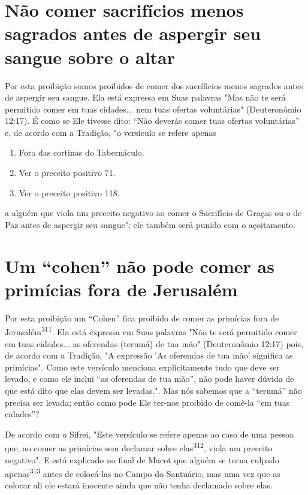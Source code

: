 \section{Não comer sacrifícios menos sagrados antes de aspergir seu sangue sobre o altar}

Por esta proibição somos proibidos de comer dos sacríficios menos
sagrados antes de aspergir seu sangue. Ela está expressa em Suas
palavras "Mas não te será permitido comer em tuas cidades... nem tuas
ofertas voluntárias" (Deuteronômio 12:17). É como se Ele tivesse dito:
``Não deverás comer tuas ofertas voluntárias'' e, de acordo com a
Tradição, "o versículo se refere apenas


\begin{enumerate}
\def\labelenumi{\arabic{enumi}.}
\setcounter{enumi}{306}
\item
 
 Fora das cortinas do Tabernáculo.
 
\item
 
 Ver o preceito positivo 71.
 
\item
 
 Ver o preceito positivo 118.
 
\end{enumerate}

a alguém que viola um preceito negativo ao comer o Sacrifício de Graças
ou o de Paz antes de aspergir seu sangue"; ele também será punido com o
açoitamento.

\section{Um ``cohen'' não pode comer as primícias fora de Jerusalém}

Por esta proibição um ``Cohen'' fica proibido de comer as primícias fora
de Jerusalém\textsuperscript{311}. Ela está expressa em Suas palavras
"Não te será permiti­do comer em tuas cidades... as oferendas (terumá)
de tua mão" (Deuteronômio 12:17) pois, de acordo com a Tradição, "A
expressão 'As oferendas de tua mão' significa as primícias". Como este
versículo menciona explicitamente tudo que deve ser levado, e como ele
inclui ``as oferendas de tua mão'', não pode haver dúvida de que está dito
que elas devem ser levadas.". Mas nós sabemos que a
``terumá'' não precisa ser levada; então como pode Ele ter-nos proibido de
comê-la ``em tuas cidades''?

De acordo com o Sifrei, "Este versículo se refere apenas ao caso de uma
pessoa que, ao comer as primícias sem declamar sobre
elas\textsuperscript{312}, viola um preceito negativo". E está explicado
no final de Macot que alguém se torna cul­pado
apenas\textsuperscript{313} antes de colocá-las no Campo do Santuário,
mas uma vez que as colocar ali ele estará inocente ainda que não tenha
declamado sobre elas.

